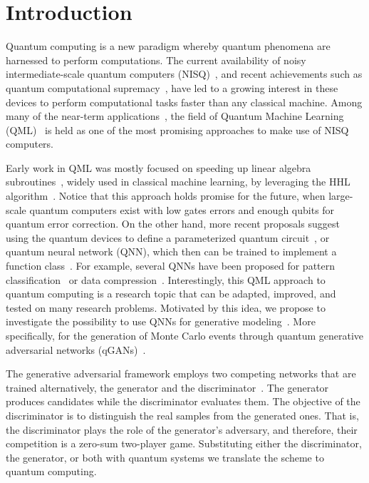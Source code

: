 \documentclass[twocolumn,preprintnumbers,superscriptaddress]{revtex4-2}
\begin{document}
\section{Introduction}
Quantum computing is a new paradigm whereby quantum phenomena are harnessed to perform computations. The current availability of noisy intermediate-scale quantum computers (NISQ)~\cite{nisq}, and recent achievements such as quantum computational supremacy~\cite{supremacy, zhong2020quantum}, have led to a growing interest in these devices to perform computational tasks faster than any classical machine. Among many of the near-term applications~\cite{cerezo2021variational, bharti2021noisy}, the field of Quantum Machine Learning (QML)~\cite{biamonte2017quantum, schuld2018supervised} is held as one of the most promising approaches to make use of NISQ computers.

Early work in QML was mostly focused on speeding up linear algebra subroutines~\cite{wiebe2012quantum, lloyd:2013ml, Rebentrost:2014svm, kerenidis2020quantum}, widely used in classical machine learning, by leveraging the HHL algorithm~\cite{harrow2009quantum}. Notice that this approach holds promise for the future, when large-scale quantum computers exist with low gates errors and enough qubits for quantum error correction. On the other hand, more recent proposals suggest using the quantum devices to define a parameterized quantum circuit~\cite{benedetti2019parameterized, sim2019expressibility, bravo2020scaling}, or quantum neural network (QNN), which then can be trained to implement a function class~\cite{schuld2021effect, goto2021universal, perez2021one}. For example, several QNNs have been proposed for pattern classification~\cite{havlivcek2019supervised, Schuld:2020circuit, perezsalinas:2020reuploading} or data compression~\cite{romero2017quantum, bravo2021quantum, cao2021noise}. Interestingly, this QML approach to quantum computing is a research topic that can be adapted, improved, and tested on many research problems. Motivated by this idea, we propose to investigate the possibility to use QNNs for generative modeling~\cite{benedetti2019generative, hamilton2019generative, coyle2020born}. More specifically, for the generation of Monte Carlo events through quantum generative adversarial networks (qGANs)~\cite{dallaire2018quantum, lloyd2018quantum}.

The generative adversarial framework employs two competing networks that are trained alternatively, the generator and the discriminator~\cite{goodfellow2014generative}. The generator produces candidates while the discriminator evaluates them. The objective of the discriminator is to distinguish the real samples from the generated ones. That is, the discriminator plays the role of the generator's adversary, and therefore, their competition is a zero-sum two-player game. Substituting either the discriminator, the generator, or both with quantum systems we translate the scheme to quantum computing.
\end{document}
